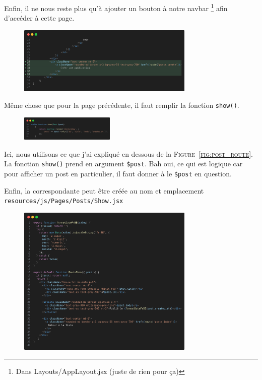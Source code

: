 Enfin, il ne nous reste plus qu'à ajouter un bouton à notre navbar \footnote{Dans Layouts/AppLayout.jsx (juste de rien pour ça)} afin d'accéder à cette page.

\begin{figure}[!h]
    \centering
    \includegraphics[width=0.75\textwidth]{figures-C1/posts_index_add_create.png}
\end{figure}

\label{sec:post_show}

Même chose que pour la page précédente, il faut remplir la fonction \verb|show()|.

\begin{figure}
    \vspace{-0.75cm}
    \includegraphics[width=0.4\textwidth]{figures-C1/postscontroller_show.png}
\end{figure}
Ici, nous utilisons ce que j'ai expliqué en dessous de la \textsc{Figure~\ref{fig:post_route}}. La fonction \verb|show()| prend en argument \verb|$post|. Bah oui, ce qui est logique car pour afficher un post en particulier, il faut donner à \laravel le \texttt{\$post} en question. 

Enfin, la \view{} correspondante peut être créée au nom et emplacement \texttt{resources/js/Pages/Posts/Show.jsx}

\begin{figure}[!h]
    \centering
    \includegraphics[width=0.75\textwidth]{figures-C1/posts_show.png}
\end{figure}

